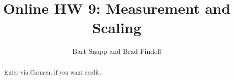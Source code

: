 \documentclass[handout,space,nooutcomes]{xourse}
\title{Online HW 9: Measurement and Scaling}
\author{Bart Snapp and Brad Findell}
\begin{document}
\begin{abstract}
Enter via Carmen, if you want credit.  
\end{abstract}
\maketitle

{}
\end{document}
